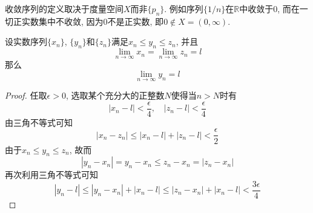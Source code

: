 \documentclass[cn,12pt,math=mtpro2,citestyle=gb7714-2015,bibstyle=gb7714-2015,twocol]{elegantbook}
\newcommand{\R}{\mathbb{R}}
\newcommand{\limn}{\lim_{n\to\infty}}
\begin{document}
\begin{remark}
收敛序列的定义取决于度量空间$X$而非$\{p_n\}$. 例如序列$\{1/n\}$在$\R$中收敛于0, 而在一切正实数集中不收敛, 因为$0$不是正实数, 即$0\not\in X=(0,\infty)$.
\end{remark}

\begin{theorem}[迫敛定理]
设实数序列$\{x_n\}$, $\{y_n\}$和$\{z_n\}$满足$x_n\leq y_n\leq z_n$, 并且
$$\limn x_n=\limn z_n=l$$
那么$$\limn y_n=l$$
\end{theorem}
\begin{proof}
  任取$\epsilon>0$, 选取某个充分大的正整数$N$使得当$n>N$时有
  $$|x_n-l|<\frac{\epsilon}{4}, \quad |z_n-l|<\frac{\epsilon}{4}$$
  由三角不等式可知
  $$|x_n-z_n|\leq |x_n-l|+|z_n-l|<\frac{\epsilon}{2}$$
  由于$x_n\leq y_n\leq z_n$, 故而
  $$|y_n-x_n|=y_n-x_n \leq z_n-x_n=|z_n-x_n|$$
  再次利用三角不等式可知
  $$|y_n-l|\leq |y_n-x_n|+|x_n-l|\leq |z_n-x_n|+|x_n-l|<\frac{3\epsilon}{4}$$
\end{proof}
\end{document}
